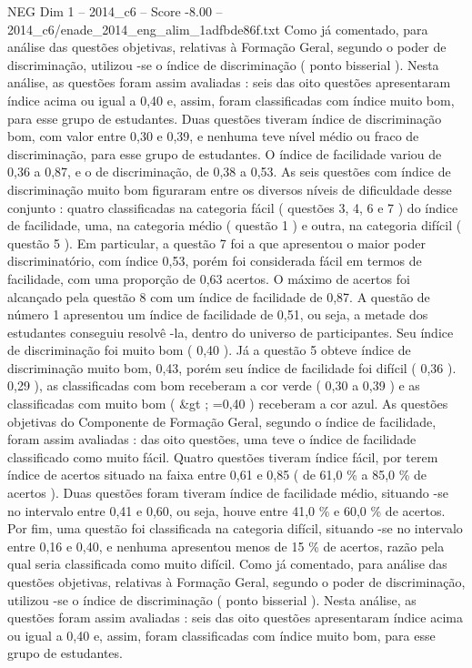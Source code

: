 \begin{textsample}{NEG Dim 1 – 2014\_c6 – Score -8.00 – 2014\_c6/enade\_2014\_eng\_alim\_1adfbde86f.txt}
Como já comentado, para análise das questões objetivas, relativas à Formação Geral, segundo o poder de discriminação, utilizou -se o índice de discriminação ( ponto bisserial ).
Nesta análise, as questões foram assim avaliadas : seis das oito questões apresentaram índice acima ou igual a 0,40 e, assim, foram classificadas com índice muito bom, para esse grupo de estudantes.
Duas questões tiveram índice de discriminação bom, com valor entre 0,30 e 0,39, e nenhuma teve nível médio ou fraco de discriminação, para esse grupo de estudantes.
O índice de facilidade variou de 0,36 a 0,87, e o de discriminação, de 0,38 a 0,53.
As seis questões com índice de discriminação muito bom figuraram entre os diversos níveis de dificuldade desse conjunto : quatro classificadas na categoria fácil ( questões 3, 4, 6 e 7 ) do índice de facilidade, uma, na categoria médio ( questão 1 ) e outra, na categoria difícil ( questão 5 ).
Em particular, a questão 7 foi a que apresentou o maior poder discriminatório, com índice 0,53, porém foi considerada fácil em termos de facilidade, com uma proporção de 0,63 acertos.
O máximo de acertos foi alcançado pela questão 8 com um índice de facilidade de 0,87.
A questão de número 1 apresentou um índice de facilidade de 0,51, ou seja, a metade dos estudantes conseguiu resolvê -la, dentro do universo de participantes.
Seu índice de discriminação foi muito bom ( 0,40 ).
Já a questão 5 obteve índice de discriminação muito bom, 0,43, porém seu índice de facilidade foi difícil ( 0,36 ). 0,29 ), as classificadas com bom receberam a cor verde ( 0,30 a 0,39 ) e as classificadas com muito bom ( \&gt ; =0,40 ) receberam a cor azul.
As questões objetivas do Componente de Formação Geral, segundo o índice de facilidade, foram assim avaliadas : das oito questões, uma teve o índice de facilidade classificado como muito fácil.
Quatro questões tiveram índice fácil, por terem índice de acertos situado na faixa entre 0,61 e 0,85 ( de 61,0 \% a 85,0 \% de acertos ).
Duas questões foram tiveram índice de facilidade médio, situando -se no intervalo entre 0,41 e 0,60, ou seja, houve entre 41,0 \% e 60,0 \% de acertos.
Por fim, uma questão foi classificada na categoria difícil, situando -se no intervalo entre 0,16 e 0,40, e nenhuma apresentou menos de 15 \% de acertos, razão pela qual seria classificada como muito difícil.
Como já comentado, para análise das questões objetivas, relativas à Formação Geral, segundo o poder de discriminação, utilizou -se o índice de discriminação ( ponto bisserial ).
Nesta análise, as questões foram assim avaliadas : seis das oito questões apresentaram índice acima ou igual a 0,40 e, assim, foram classificadas com índice muito bom, para esse grupo de estudantes.

\end{textsample}
